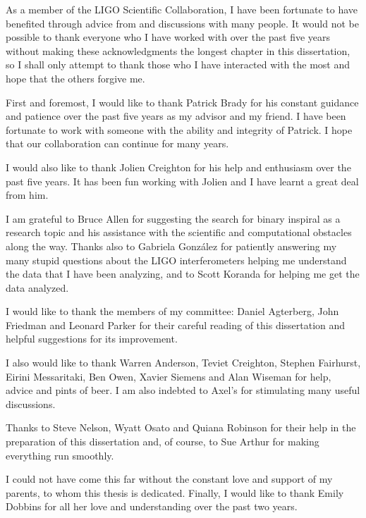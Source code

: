 
As a member of the LIGO Scientific Collaboration, I have been fortunate to
have benefited through advice from and discussions with many people. It would
not be possible to thank everyone who I have worked with over the past five
years without making these acknowledgments the longest chapter in this
dissertation, so I shall only attempt to thank those who I have interacted
with the most and hope that the others forgive me.

First and foremost, I would like to thank Patrick Brady for his constant
guidance and patience over the past five years as my advisor and my friend. I
have been fortunate to work with someone with the ability and integrity of
Patrick.  I hope that our collaboration can continue for many years.

I would also like to thank Jolien Creighton for his help and enthusiasm over
the past five years. It has been fun working with Jolien and I have learnt a
great deal from him.

I am grateful to Bruce Allen for suggesting the search for binary inspiral as
a research topic and his assistance with the scientific and computational
obstacles along the way. Thanks also to Gabriela Gonz\'{a}lez for patiently
answering my many stupid questions about the LIGO interferometers helping me
understand the data that I have been analyzing, and to Scott Koranda for
helping me get the data analyzed.

I would like to thank the members of my committee: Daniel Agterberg, John
Friedman and Leonard Parker for their careful reading of this dissertation and
helpful suggestions for its improvement.

I also would like to thank Warren Anderson, Teviet Creighton, Stephen
Fairhurst, Eirini Messaritaki, Ben Owen, Xavier Siemens and Alan Wiseman for
help, advice and pints of beer. I am also indebted to Axel's for stimulating
many useful discussions.

Thanks to Steve Nelson, Wyatt Osato and Quiana Robinson for their help in the
preparation of this dissertation and, of course, to Sue Arthur for making
everything run smoothly.

I could not have come this far without the constant love and support of my
parents, to whom this thesis is dedicated. Finally, I would like to thank
Emily Dobbins for all her love and understanding over the past two years.

